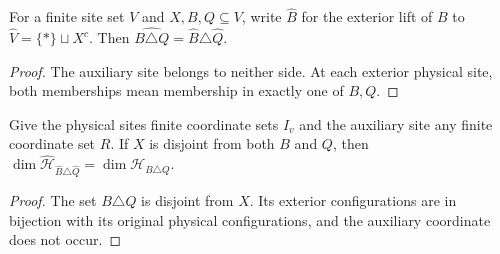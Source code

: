 \begin{theorem}
    \label{thm:exterior_region_symmetric_difference}
    \leanok
    For a finite site set $V$ and $X,B,Q\subseteq V$, write
    $\widehat B$ for the exterior lift of $B$ to
    $\widehat V=\{*\}\sqcup X^c$. Then
    $\widehat{B\triangle Q}=\widehat B\triangle\widehat Q$.
\end{theorem}
\begin{proof}\leanok
    The auxiliary site belongs to neither side. At each exterior physical
    site, both memberships mean membership in exactly one of $B,Q$.
\end{proof}

\begin{theorem}
    \label{thm:exterior_difference_dimension}
    \leanok
    Give the physical sites finite coordinate sets $I_v$ and the
    auxiliary site any finite coordinate set $R$.
    If $X$ is disjoint from both $B$ and $Q$, then
    $\dim\widehat{\mathcal H}_{\widehat B\triangle\widehat Q}
    =\dim\mathcal H_{B\triangle Q}$.
\end{theorem}
\begin{proof}\leanok
    The set $B\triangle Q$ is disjoint from $X$. Its exterior
    configurations are in bijection with its original physical
    configurations, and the auxiliary coordinate does not occur.
\end{proof}

